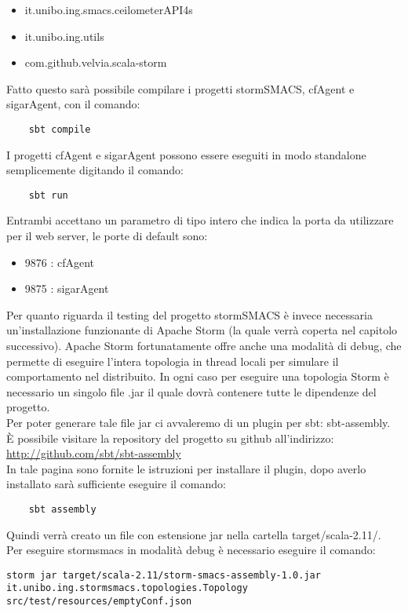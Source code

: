 \documentclass[12pt]{article}
\begin{document}
\begin{itemize}
\item it.unibo.ing.smacs.ceilometerAPI4s
\item it.unibo.ing.utils
\item com.github.velvia.scala-storm
\end{itemize}
Fatto questo sar\`a possibile compilare i progetti stormSMACS, cfAgent e sigarAgent, con il comando:
\begin{lstlisting}
	sbt compile
\end{lstlisting}
I progetti cfAgent e sigarAgent possono essere eseguiti in modo standalone semplicemente digitando il comando:
\begin{lstlisting}
	sbt run
\end{lstlisting}
Entrambi accettano un parametro di tipo intero che indica la porta da utilizzare per il web server, le porte di default sono:
\begin{itemize}
\item 9876 : cfAgent 
\item 9875 : sigarAgent
\end{itemize}
Per quanto riguarda il testing del progetto stormSMACS \`e invece necessaria un'installazione funzionante di Apache Storm (la quale verr\`a coperta nel capitolo successivo). Apache Storm fortunatamente offre anche una modalit\`a di debug, che permette di eseguire l'intera topologia in thread locali per simulare il comportamento nel distribuito.
In ogni caso per eseguire una topologia Storm \`e necessario un singolo file .jar il quale dovr\`a contenere tutte le dipendenze del progetto. \\
Per poter generare tale file jar ci avvaleremo di un plugin per sbt: sbt-assembly.\\
\`E possibile visitare la repository del progetto su github all'indirizzo: \url{http://github.com/sbt/sbt-assembly}\\
In tale pagina sono fornite le istruzioni per installare il plugin, dopo averlo installato sar\`a sufficiente eseguire il comando:
\begin{lstlisting}
	sbt assembly
\end{lstlisting}
Quindi verr\`a creato un file con estensione jar nella cartella target/scala-2.11/.\\
Per eseguire stormsmacs in modalit\`a debug \`e necessario eseguire il comando:
\begin{lstlisting}
storm jar target/scala-2.11/storm-smacs-assembly-1.0.jar it.unibo.ing.stormsmacs.topologies.Topology src/test/resources/emptyConf.json
\end{lstlisting}
\end{document}
